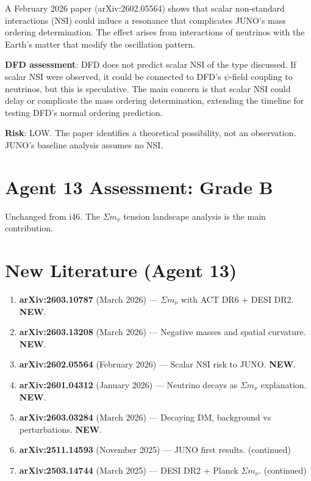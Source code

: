 \documentclass[11pt,a4paper]{article}
\newcommand{\NEW}{\textcolor{dfdblue}{\textbf{NEW}}}
\begin{document}
\begin{tcolorbox}[colback=blue!5!white, colframe=blue!60!black,
  title={arXiv:2602.05564: Scalar Non-Standard Interactions Could Affect JUNO}]

A February 2026 paper (arXiv:2602.05564) shows that scalar non-standard interactions (NSI) could induce a resonance that complicates JUNO's mass ordering determination. The effect arises from interactions of neutrinos with the Earth's matter that modify the oscillation pattern.

\textbf{DFD assessment}: DFD does not predict scalar NSI of the type discussed. If scalar NSI were observed, it could be connected to DFD's $\psi$-field coupling to neutrinos, but this is speculative. The main concern is that scalar NSI could delay or complicate the mass ordering determination, extending the timeline for testing DFD's normal ordering prediction.

\textbf{Risk}: LOW. The paper identifies a theoretical possibility, not an observation. JUNO's baseline analysis assumes no NSI.
\end{tcolorbox}

\section{Agent 13 Assessment: Grade B}

Unchanged from i46. The $\Sigma m_\nu$ tension landscape analysis is the main contribution.

\section{New Literature (Agent 13)}

\begin{enumerate}
\item \textbf{arXiv:2603.10787} (March 2026) --- $\Sigma m_\nu$ with ACT DR6 + DESI DR2. \NEW.
\item \textbf{arXiv:2603.13208} (March 2026) --- Negative masses and spatial curvature. \NEW.
\item \textbf{arXiv:2602.05564} (February 2026) --- Scalar NSI risk to JUNO. \NEW.
\item \textbf{arXiv:2601.04312} (January 2026) --- Neutrino decays as $\Sigma m_\nu$ explanation. \NEW.
\item \textbf{arXiv:2603.03284} (March 2026) --- Decaying DM, background vs perturbations. \NEW.
\item \textbf{arXiv:2511.14593} (November 2025) --- JUNO first results. (continued)
\item \textbf{arXiv:2503.14744} (March 2025) --- DESI DR2 + Planck $\Sigma m_\nu$. (continued)
\end{enumerate}
\end{document}
